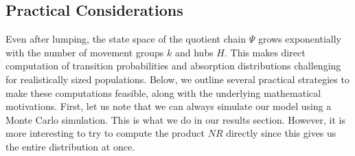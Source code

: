 \documentclass[a4paper]{article}
\begin{document}
	\subsection{Practical Considerations}
	Even after lumping, the state space of the quotient chain $\Psi$ grows exponentially with the number of movement groups $k$ and hubs $H$. This makes direct computation of transition probabilities and absorption distributions challenging for realistically sized populations. Below, we outline several practical strategies to make these computations feasible, along with the underlying mathematical motivations.
	First, let us note that we can always simulate our model using a Monte Carlo simulation. This is what we do in our results section. However, it is more interesting to try to compute the product $NR$ directly since this gives us the entire distribution at once.
\end{document}

